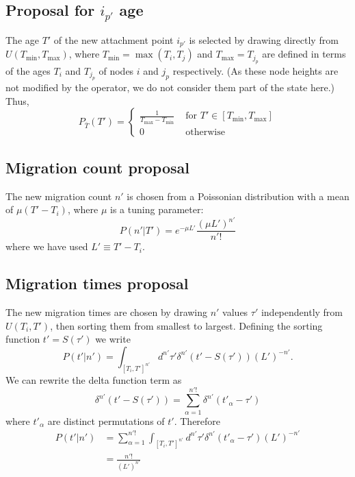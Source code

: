 \documentclass[a4paper,11pt]{article}
\begin{document}
\subsection{Proposal for $i_{p'}$ age}

The age $T'$ of the new attachment point $i_{p'}$ is selected by drawing directly from
$U(T_{\min},T_{\max})$, where $T_{\min}=\max(T_i,T_j)$ and
$T_{\max}=T_{j_p}$ are defined in terms of the ages $T_i$ and
$T_{j_p}$ of nodes $i$ and $j_p$ respectively. (As these node heights
are not modified by the operator, we do not consider them part of the
state here.) Thus,
\begin{equation}
  P_{\bar{T}}(T') = \left\{\begin{array}{rl}
      \frac{1}{T_{\max}-T_{\min}} & \text{ for } T'\in[T_{\min},T_{\max}]\\
      0 & \text{ otherwise}\end{array}\right.
\end{equation}

\subsection{Migration count proposal}

The new migration count $n'$ is chosen from a Poissonian distribution
with a mean of $\mu (T'-T_i)$, where $\mu$ is a tuning parameter:
\begin{equation}
  P(n'|T') = e^{-\mu L'}\frac{(\mu L')^{n'}}{n'!}
\end{equation}
where we have used $L'\equiv T'-T_i$.

\subsection{Migration times proposal}

The new migration times are chosen by drawing $n'$ values $\tau'$
independently from $U(T_i,T')$, then sorting them from smallest to
largest. Defining the sorting function $t'=S(\tau')$ we write
\begin{equation}
  P(t'|n') = \int_{[T_i,T']^{n'}}d^{n'}\tau'\delta^{n'}(t'-S(\tau'))(L')^{-n'}.
\end{equation}
We can rewrite the delta function term as
\begin{equation}
  \delta^{n'}(t'-S(\tau'))=\sum_{\alpha=1}^{n'!}\delta^{n'}(t'_{\alpha}-\tau')
\end{equation}
where $t'_{\alpha}$ are distinct permutations of $t'$. Therefore
\begin{align}
  P(t'|n')&=\sum_{\alpha=1}^{n'!}\int_{[T_i,T']^{n'}}d^{n'}\tau'\delta^{n'}(t'_{\alpha}-\tau')(L')^{-n'}\nonumber\\
&=\frac{n'!}{(L')^{n'}}
\end{align}
\end{document}

